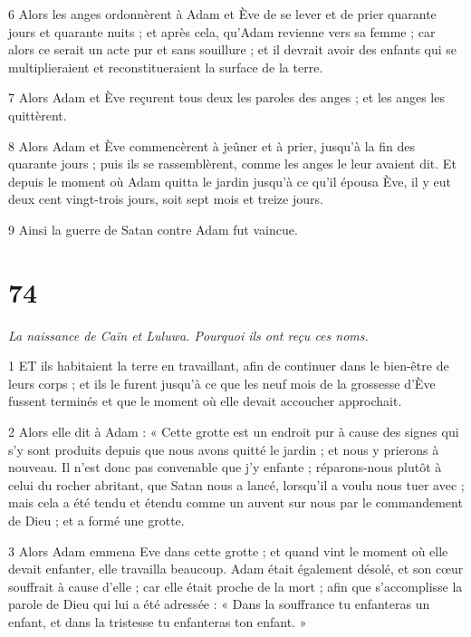 \par 6 Alors les anges ordonnèrent à Adam et Ève de se lever et de prier quarante jours et quarante nuits ; et après cela, qu'Adam revienne vers sa femme ; car alors ce serait un acte pur et sans souillure ; et il devrait avoir des enfants qui se multiplieraient et reconstitueraient la surface de la terre.

\par 7 Alors Adam et Ève reçurent tous deux les paroles des anges ; et les anges les quittèrent.

\par 8 Alors Adam et Ève commencèrent à jeûner et à prier, jusqu'à la fin des quarante jours ; puis ils se rassemblèrent, comme les anges le leur avaient dit. Et depuis le moment où Adam quitta le jardin jusqu'à ce qu'il épousa Ève, il y eut deux cent vingt-trois jours, soit sept mois et treize jours.

\par 9 Ainsi la guerre de Satan contre Adam fut vaincue.



\chapter{74}

\par \textit{La naissance de Caïn et Luluwa. Pourquoi ils ont reçu ces noms.}

\par 1 ET ils habitaient la terre en travaillant, afin de continuer dans le bien-être de leurs corps ; et ils le furent jusqu'à ce que les neuf mois de la grossesse d'Ève fussent terminés et que le moment où elle devait accoucher approchait.

\par 2 Alors elle dit à Adam : « Cette grotte est un endroit pur à cause des signes qui s'y sont produits depuis que nous avons quitté le jardin ; et nous y prierons à nouveau. Il n’est donc pas convenable que j’y enfante ; réparons-nous plutôt à celui du rocher abritant, que Satan nous a lancé, lorsqu'il a voulu nous tuer avec ; mais cela a été tendu et étendu comme un auvent sur nous par le commandement de Dieu ; et a formé une grotte.

\par 3 Alors Adam emmena Eve dans cette grotte ; et quand vint le moment où elle devait enfanter, elle travailla beaucoup. Adam était également désolé, et son cœur souffrait à cause d'elle ; car elle était proche de la mort ; afin que s'accomplisse la parole de Dieu qui lui a été adressée : « Dans la souffrance tu enfanteras un enfant, et dans la tristesse tu enfanteras ton enfant. »

